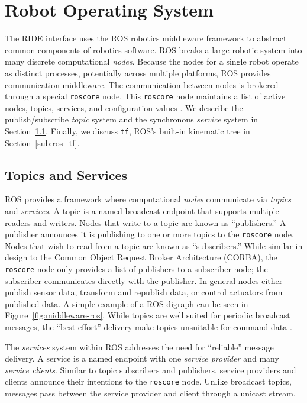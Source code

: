 
\section{Robot Operating System}
\label{sec:ros}
The RIDE interface uses the ROS robotics middleware framework to abstract common components of robotics software. ROS breaks a large robotic system into many discrete computational \emph{nodes}. Because the nodes for a single robot operate as distinct processes, potentially across multiple platforms, ROS provides communication middleware. The communication between nodes is brokered through a special \verb!roscore! node. This \verb!roscore! node maintains a list of active nodes, topics, services, and configuration values \cite{ROS09}. We describe the publish/subscribe \emph{topic} system and the synchronous \emph{service} system in Section~\ref{sub:ros_net}. Finally, we discuss \verb!tf!, ROS's built-in kinematic tree in Section~\ref{sub:ros_tf}.

\subsection{Topics and Services}
\label{sub:ros_net}
ROS provides a framework where computational \emph{nodes} communicate via \emph{topics} and \emph{services}. A topic is a named broadcast endpoint that supports multiple readers and writers. Nodes that write to a topic are known as ``publishers.'' A publisher announces it is publishing to one or more topics to the \verb!roscore! node. Nodes that wish to read from a topic are known as ``subscribers.'' While similar in design to the Common Object Request Broker Architecture (CORBA), the \verb!roscore! node only provides a list of publishers to a subscriber node; the subscriber communicates directly with the publisher. In general nodes either publish sensor data, transform and republish data, or control actuators from published data. A simple example of a ROS digraph can be seen in Figure~\ref{fig:middleware-ros}. While topics are well suited for periodic broadcast messages, the ``best effort'' delivery make topics unsuitable for command data \cite{ROS09}.

The \emph{services} system within ROS addresses the need for ``reliable'' message delivery. A service is a named endpoint with one \emph{service provider} and many \emph{service clients}.  Similar to topic subscribers and publishers, service providers and clients announce their intentions to the \verb!roscore! node. Unlike broadcast topics, messages pass between the service provider and client through a unicast stream. 

